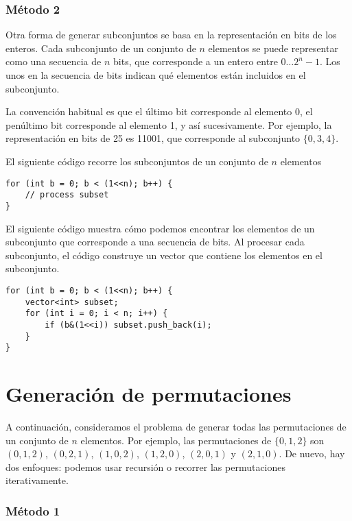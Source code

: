 \subsubsection{Método 2}

Otra forma de generar subconjuntos se basa en
la representación en bits de los enteros.
Cada subconjunto de un conjunto de $n$ elementos
se puede representar como una secuencia de $n$ bits,
que corresponde a un entero entre $0 \ldots 2^n-1$.
Los unos en la secuencia de bits indican
qué elementos están incluidos en el subconjunto.

La convención habitual es que
el último bit corresponde al elemento 0,
el penúltimo bit corresponde al elemento 1,
y así sucesivamente.
Por ejemplo, la representación en bits de 25
es 11001, que corresponde al subconjunto $\{0,3,4\}$.

El siguiente código recorre los subconjuntos
de un conjunto de $n$ elementos

\begin{lstlisting}
for (int b = 0; b < (1<<n); b++) {
    // process subset
}
\end{lstlisting}

El siguiente código muestra cómo podemos encontrar
los elementos de un subconjunto que corresponde a una secuencia de bits.
Al procesar cada subconjunto,
el código construye un vector que contiene los
elementos en el subconjunto.
\begin{lstlisting}
for (int b = 0; b < (1<<n); b++) {
    vector<int> subset;
    for (int i = 0; i < n; i++) {
        if (b&(1<<i)) subset.push_back(i);
    }
}
\end{lstlisting}

\section{Generación de permutaciones}


A continuación, consideramos el problema de generar
todas las permutaciones de un conjunto de $n$ elementos.
Por ejemplo, las permutaciones de $\{0,1,2\}$ son
$(0,1,2)$, $(0,2,1)$, $(1,0,2)$, $(1,2,0)$,
$(2,0,1)$ y $(2,1,0)$.
De nuevo, hay dos enfoques:
podemos usar recursión o recorrer las
permutaciones iterativamente.

\subsubsection{Método 1}

